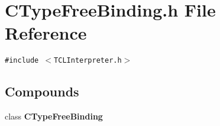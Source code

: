 \section{CType\-Free\-Binding.h File Reference}
\label{CTypeFreeBinding_8h}
{\tt \#include $<$TCLInterpreter.h$>$}\par
\subsection*{Compounds}
\begin{CompactItemize}
\item 
class {\bf CType\-Free\-Binding}
\end{CompactItemize}
